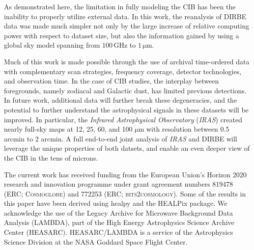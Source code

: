 \documentclass{aa}
\begin{document}
As demonstrated here, the limitation in fully modeling the CIB has been the inability to properly utilize external data. In this work, the reanalysis of DIRBE data was made much simpler not only by the large increase of relative computing power with respect to dataset size, but also the information gained by using a global sky model spanning from $100\,\mathrm{GHz}$ to $1\,\mathrm{\mu m}$.

Much of this work is made possible through the use of archival time-ordered data with complementary scan strategies, frequency coverage, detector technologies, and observation time. In the case of CIB studies, the interplay between foregrounds, namely zodiacal and Galactic dust, has limited previous detections. In future work, additional data will further break these degeneracies, and the potential to further understand the astrophysical signals in these datasets will be improved. In particular, the \textit{Infrared Astrophysical Observatory} (\textit{IRAS}) created nearly full-sky maps at 12, 25, 60, and 100 $\mathrm{\mu m}$ with resolution between 0.5 arcmin to 2 arcmin. A full end-to-end joint analysis of \textit{IRAS} and DIRBE will leverage the unique properties of both datsets, and enable an even deeper view of the CIB in the tens of microns.

\begin{acknowledgements}
 The current work has received funding from the European
  Union’s Horizon 2020 research and innovation programme under grant
  agreement numbers 819478 (ERC; \textsc{Cosmoglobe}) and 772253 (ERC;
	\textsc{bits2cosmology}). Some of the results in this paper have been derived using healpy \citep{Zonca2019} and the HEALPix \citep{healpix} package.
  We acknowledge the use of the Legacy Archive for Microwave Background Data
  Analysis (LAMBDA), part of the High Energy Astrophysics Science Archive Center
  (HEASARC). HEASARC/LAMBDA is a service of the Astrophysics Science Division at
  the NASA Goddard Space Flight Center.  
\end{acknowledgements}


%



\end{document}
